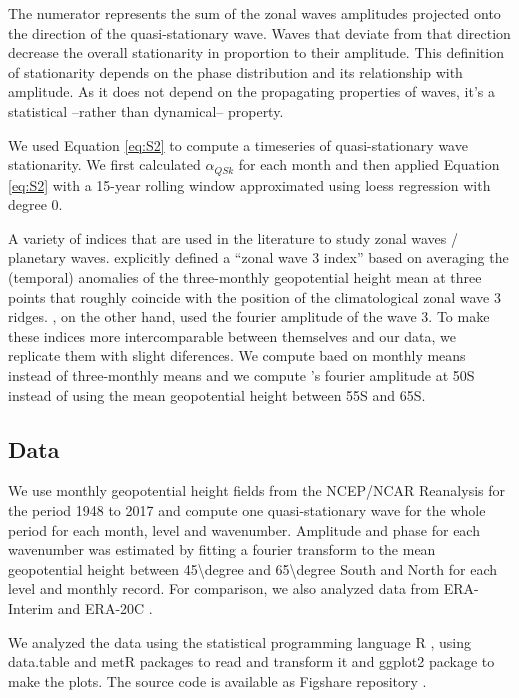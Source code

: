 \documentclass[draft,linenumbers]{agujournal2018}
\begin{document}
The numerator represents the sum of the zonal waves amplitudes projected
onto the direction of the quasi-stationary wave. Waves that deviate from
that direction decrease the overall stationarity in proportion to their
amplitude. This definition of stationarity depends on the phase
distribution and its relationship with amplitude. As it does not depend
on the propagating properties of waves, it's a statistical --rather than
dynamical-- property.

We used Equation \ref{eq:S2} to compute a timeseries of quasi-stationary
wave stationarity. We first calculated \(\alpha_{QSk}\) for each month
and then applied Equation \ref{eq:S2} with a 15-year rolling window
approximated using loess regression with degree 0.

A variety of indices that are used in the literature to study zonal
waves / planetary waves. \citet{raphael2004b} explicitly defined a
``zonal wave 3 index'' based on averaging the (temporal) anomalies of
the three-monthly geopotential height mean at three points that roughly
coincide with the position of the climatological zonal wave 3 ridges.
\citet{turner2017}, on the other hand, used the fourier amplitude of the
wave 3. To make these indices more intercomparable between themselves
and our data, we replicate them with slight diferences. We compute
\citet{raphael2004b} baed on monthly means instead of three-monthly
means and we compute \citet{turner2017}'s fourier amplitude at 50S
instead of using the mean geopotential height between 55S and 65S.

\subsection{Data}

We use monthly geopotential height fields from the NCEP/NCAR Reanalysis
\citep{kalnay1996} for the period 1948 to 2017 and compute one
quasi-stationary wave for the whole period for each month, level and
wavenumber. Amplitude and phase for each wavenumber was estimated by
fitting a fourier transform to the mean geopotential height between
45\textbackslash degree and 65\textbackslash degree South and North for
each level and monthly record. For comparison, we also analyzed data
from ERA-Interim \citep{dee2011} and ERA-20C \citep{poli2016}.

We analyzed the data using the statistical programming language R
\citep{R-base}, using data.table \citep{R-data.table} and metR
\citep{R-metR} packages to read and transform it and ggplot2 package
\citep{R-ggplot2} to make the plots. The source code is available as
Figshare repository \citep{Campitelli2019-figshare}.
\end{document}
